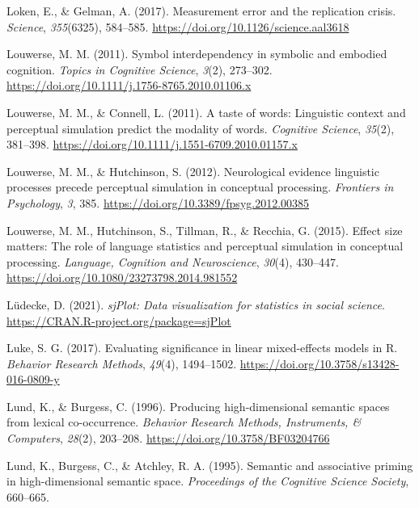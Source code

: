 \documentclass[
  12pt,
  man,floatsintext]{apa7}
\newlength{\cslhangindent}
\newlength{\cslentryspacingunit} %
\newenvironment{CSLReferences}[2] %
 {%
  \setlength{\parindent}{0pt}
  \ifodd #1
  \let\oldpar\par
  \def\par{\hangindent=\cslhangindent\oldpar}
  \fi
  \setlength{\parskip}{#2\cslentryspacingunit}
 }%
 {}
\begin{document}
\begin{CSLReferences}{1}{0}
\leavevmode{}%
Loken, E., \& Gelman, A. (2017). Measurement error and the replication crisis. \emph{Science}, \emph{355}(6325), 584--585. \url{https://doi.org/10.1126/science.aal3618}

\leavevmode{}%
Louwerse, M. M. (2011). Symbol interdependency in symbolic and embodied cognition. \emph{Topics in Cognitive Science}, \emph{3}(2), 273--302. \url{https://doi.org/10.1111/j.1756-8765.2010.01106.x}

\leavevmode{}%
Louwerse, M. M., \& Connell, L. (2011). A taste of words: Linguistic context and perceptual simulation predict the modality of words. \emph{Cognitive Science}, \emph{35}(2), 381--398. \url{https://doi.org/10.1111/j.1551-6709.2010.01157.x}

\leavevmode{}%
Louwerse, M. M., \& Hutchinson, S. (2012). Neurological evidence linguistic processes precede perceptual simulation in conceptual processing. \emph{Frontiers in Psychology}, \emph{3}, 385. \url{https://doi.org/10.3389/fpsyg.2012.00385}

\leavevmode{}%
Louwerse, M. M., Hutchinson, S., Tillman, R., \& Recchia, G. (2015). Effect size matters: {The} role of language statistics and perceptual simulation in conceptual processing. \emph{Language, Cognition and Neuroscience}, \emph{30}(4), 430--447. \url{https://doi.org/10.1080/23273798.2014.981552}

\leavevmode{}%
Lüdecke, D. (2021). \emph{sjPlot: Data visualization for statistics in social science}. \url{https://CRAN.R-project.org/package=sjPlot}

\leavevmode{}%
Luke, S. G. (2017). Evaluating significance in linear mixed-effects models in {R}. \emph{Behavior Research Methods}, \emph{49}(4), 1494--1502. \url{https://doi.org/10.3758/s13428-016-0809-y}

\leavevmode{}%
Lund, K., \& Burgess, C. (1996). Producing high-dimensional semantic spaces from lexical co-occurrence. \emph{Behavior Research Methods, Instruments, \& Computers}, \emph{28}(2), 203--208. \url{https://doi.org/10.3758/BF03204766}

\leavevmode{}%
Lund, K., Burgess, C., \& Atchley, R. A. (1995). Semantic and associative priming in high-dimensional semantic space. \emph{Proceedings of the Cognitive Science Society}, 660--665.


\end{CSLReferences}
\end{document}
